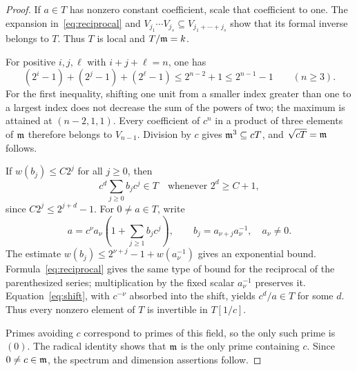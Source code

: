 \begin{proof}
If $a\in T$ has nonzero constant coefficient, scale that
coefficient to one. The expansion in~\eqref{eq:reciprocal} and
$V_{j_1}\cdots V_{j_s}\subseteq V_{j_1+\cdots+j_s}$ show that
its formal inverse belongs to $T$. Thus $T$ is local and $T/\mathfrak m=k$.

For positive $i,j,\ell$ with $i+j+\ell=n$, one has
\begin{equation}\label{eq:cube-estimate}
 (2^i-1)+(2^j-1)+(2^\ell-1)
 \le2^{n-2}+1\le2^{n-1}-1\qquad(n\ge3).
\end{equation}
For the first inequality, shifting one unit from a smaller index
greater than one to a largest index does not decrease the sum of
the powers of two; the maximum is attained at $(n-2,1,1)$.
Every coefficient of $c^n$ in a product of three elements of $\mathfrak m$
therefore belongs to $V_{n-1}$. Division by $c$ gives
$\mathfrak m^3\subseteq cT$, and $\sqrt{cT}=\mathfrak m$ follows.

If $w(b_j)\le C2^j$ for all $j\ge0$, then
\begin{equation}\label{eq:shift}
 c^d\sum_{j\ge0}b_jc^j\in T
 \quad\text{whenever }2^d\ge C+1,
\end{equation}
since $C2^j\le2^{j+d}-1$. For $0\ne a\in T$, write
\[
 a=c^\nu a_\nu\left(1+\sum_{j\ge1}b_jc^j\right),
 \qquad b_j=a_{\nu+j}a_\nu^{-1},\quad a_\nu\ne0.
\]
The estimate
$w(b_j)\le2^{\nu+j}-1+w(a_\nu^{-1})$ gives an exponential
bound. Formula~\eqref{eq:reciprocal} gives the same type of bound
for the reciprocal of the parenthesized series; multiplication by
the fixed scalar $a_\nu^{-1}$ preserves it.
Equation~\eqref{eq:shift}, with $c^{-\nu}$ absorbed into the
shift, yields $c^d/a\in T$ for some $d$.
Thus every nonzero element of $T$ is invertible in $T[1/c]$.

Primes avoiding $c$ correspond to primes of this field, so the only
such prime is $(0)$. The radical identity shows that $\mathfrak m$ is the
only prime containing $c$. Since $0\ne c\in\mathfrak m$, the spectrum
and dimension assertions follow.
\end{proof}
